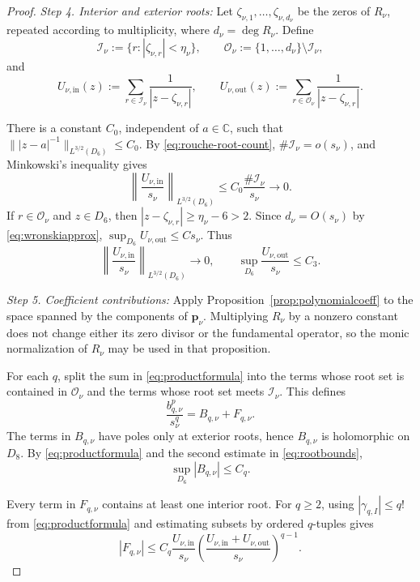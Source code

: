 \documentclass[12pt,letterpaper,reqno]{amsart}
\theoremstyle{definition}
\numberwithin{equation}{section}
\newcommand{\C}{\mathbb C}
\newcommand{\pv}{\bm p}
\begin{document}
\begin{proof}
\medskip\noindent
\emph{{Step 4. Interior and exterior roots:}}
Let
\(\zeta_{\nu,1},\ldots,\zeta_{\nu,d_\nu}\) be the zeros of \(R_\nu\),
repeated according to multiplicity, where
\(d_\nu=\deg R_\nu\). Define
\[
 \mathcal I_\nu
 :=
 \{r:|\zeta_{\nu,r}|<\eta_\nu\},
 \qquad
 \mathcal O_\nu
 :=
 \{1,\ldots,d_\nu\}\setminus\mathcal I_\nu,
\]
and
\[
 U_{\nu,\mathrm{in}}(z)
 :=
 \sum_{r\in\mathcal I_\nu}
 \frac1{|z-\zeta_{\nu,r}|},
 \qquad
 U_{\nu,\mathrm{out}}(z)
 :=
 \sum_{r\in\mathcal O_\nu}
 \frac1{|z-\zeta_{\nu,r}|}.
\]

There is a constant \(C_0\), independent of \(a\in\C\), such that
\(\||z-a|^{-1}\|_{L^{3/2}(D_6)}\leq C_0\).
By \eqref{eq:rouche-root-count},
\(\#\mathcal I_\nu=o(s_\nu)\), and Minkowski's inequality gives
\[
 \left\|
 \frac{U_{\nu,\mathrm{in}}}{s_\nu}
 \right\|_{L^{3/2}(D_6)}
 \leq
 C_0\frac{\#\mathcal I_\nu}{s_\nu}
 \longrightarrow0.
\]
If \(r\in\mathcal O_\nu\) and \(z\in D_6\), then
\(|z-\zeta_{\nu,r}|\geq\eta_\nu-6>2\).
Since \(d_\nu=O(s_\nu)\) by \eqref{eq:wronskiapprox},
\(\sup_{D_6}U_{\nu,\mathrm{out}}\leq C s_\nu\).
Thus
\begin{equation}\label{eq:rootbounds}
 \left\|
 \frac{U_{\nu,\mathrm{in}}}{s_\nu}
 \right\|_{L^{3/2}(D_6)}
 \longrightarrow0,
 \qquad
 \sup_{D_6}
 \frac{U_{\nu,\mathrm{out}}}{s_\nu}
 \leq C_3.
\end{equation}


\medskip\noindent
\emph{{Step 5. Coefficient contributions:}}
Apply Proposition~\ref{prop:polynomialcoeff} to the space spanned by
the components of \(\pv_\nu\). Multiplying
\(R_\nu\) by a nonzero constant does not change either its zero divisor
or the fundamental operator, so the monic normalization of \(R_\nu\)
may be used in that proposition.

For each \(q\), split the sum in \eqref{eq:productformula} into the
terms whose root set is contained in \(\mathcal O_\nu\) and the terms
whose root set meets \(\mathcal I_\nu\). This defines
\begin{equation}\label{eq:splitcoeff}
 \frac{b_{q,\nu}^p}{s_\nu^q}
 =
 B_{q,\nu}+F_{q,\nu}.
\end{equation}
The terms in \(B_{q,\nu}\) have poles only at exterior roots, hence
\(B_{q,\nu}\) is holomorphic on \(D_8\). By
\eqref{eq:productformula} and the second estimate in
\eqref{eq:rootbounds},
\begin{equation}\label{eq:B-bound}
 \sup_{D_6}|B_{q,\nu}|
 \leq C_q.
\end{equation}

Every term in \(F_{q,\nu}\) contains at least one interior root.
For \(q\ge2\), using \(|\gamma_{q,I}|\leq q!\) from
\eqref{eq:productformula} and estimating subsets by ordered
\(q\)-tuples gives
\begin{equation}\label{eq:F-bound}
 |F_{q,\nu}|
 \leq
 C_q
 \frac{U_{\nu,\mathrm{in}}}{s_\nu}
 \left(
 \frac{U_{\nu,\mathrm{in}}+U_{\nu,\mathrm{out}}}{s_\nu}
 \right)^{q-1}.
\end{equation}


\end{proof}
\end{document}
